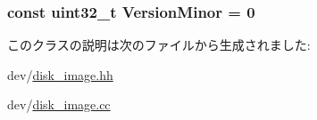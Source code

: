 \label{classCowDiskImage_aea9111b09377b8ceea1a83f731859e94}
\hypertarget{classCowDiskImage_ab69a15e46e9c6523e2b08bcff16b3013}{
\subsubsection[{VersionMinor}]{\setlength{\rightskip}{0pt plus 5cm}const {\bf uint32\_\-t} {\bf VersionMinor} = 0}}
\label{classCowDiskImage_ab69a15e46e9c6523e2b08bcff16b3013}


このクラスの説明は次のファイルから生成されました:\begin{DoxyCompactItemize}
\item 
dev/\hyperlink{disk__image_8hh}{disk\_\-image.hh}\item 
dev/\hyperlink{disk__image_8cc}{disk\_\-image.cc}\end{DoxyCompactItemize}
